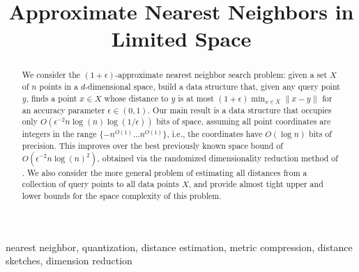 \documentclass[final,12pt]{colt2018}
\title[Approximate Nearest Neighbors in Limited  Space]{Approximate Nearest Neighbors in Limited  Space}
\numberwithin{theorem}{section}
\newcommand{\1}{{\rm 1\hspace*{-0.4ex}%

\rule{0.1ex}{1.52ex}\hspace*{0.2ex}}}
\begin{document}
\maketitle

\begin{abstract}
We consider the $(1+\epsilon)$-approximate nearest neighbor search problem: given a set $X$ of $n$ points in a $d$-dimensional space, build a data structure that, given any query point  $y$,  finds a point $x \in X$ whose distance to $y$ is at most $(1+\epsilon) \min_{x \in X} \|x-y\|$ for an accuracy parameter $\epsilon \in (0,1)$.  Our main result is a data structure that occupies only $O(\epsilon^{-2} n \log(n) \log(1/\epsilon))$
bits of space, assuming all point coordinates are integers in the range  $\{-n^{O(1)} \ldots n^{O(1)}\}$, i.e., the coordinates have $O(\log n)$ bits of precision. This improves over the best previously known space bound of         $O(\epsilon^{-2} n \log(n)^2)$, obtained via the randomized dimensionality reduction method of \cite{johnson1984extensions}.  We also consider the more general problem of estimating all distances from a collection of query points to all data points $X$, and provide almost tight upper and lower bounds for the space complexity of this problem. 
\end{abstract}

\begin{keywords}
nearest neighbor, quantization, distance estimation, metric compression, distance sketches, dimension reduction
\end{keywords}














\newpage
\appendix




\end{document}
